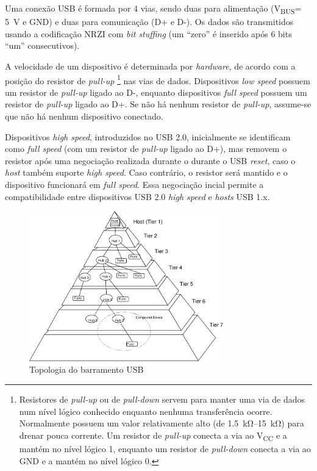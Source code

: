 \documentclass[brazil,pagestart=firstchapter]{abnt}
\newcommand{\VBUS}{V\textsubscript{BUS}\xspace}
\newcommand{\VCC}{V\textsubscript{CC}\xspace}
\newcommand{\GND}{GND\xspace}
\begin{document}
Uma conexão \ac{USB} é formada por 4 vias, sendo duas para alimentação
(\VBUS = \SI{+5}{\volt} e \GND) e duas para comunicação (D+ e D-). Os dados
são transmitidos usando a codificação \ac{NRZI} com \textit{bit stuffing}
(um ``zero'' é inserido após 6 bits ``um'' consecutivos).
\cite[p.~157]{usb20} \cite[cap.~2]{usbinanutshell}

A velocidade de um dispositivo é determinada por \textit{hardware}, de
acordo com a posição do resistor de \textit{pull-up}
	\footnote{Resistores de \textit{pull-up} ou de \textit{pull-down} servem
	para manter uma via de dados num nível lógico conhecido enquanto nenhuma
	transferência ocorre.  Normalmente possuem um valor relativamente alto
	(de \SIrange{1.5}{15}{\kilo\ohm}) para drenar pouca corrente. Um
	resistor de \textit{pull-up} conecta a via ao \VCC e a mantém no nível
	lógico 1, enquanto um resistor de \textit{pull-down} conecta a via ao
	\GND e a mantém no nível lógico 0.}
nas vias de dados. Dispositivos
\textit{low speed} possuem um resistor de \textit{pull-up} ligado ao D-,
enquanto dispositivos \textit{full speed} possuem  um resistor de
\textit{pull-up} ligado ao D+. Se não há nenhum resistor de
\textit{pull-up}, assume-se que não há nenhum dispositivo conectado.
\cite[p.~141]{usb20} \cite[cap.~2]{usbinanutshell}

Dispositivos \textit{high speed}, introduzidos no \ac{USB} 2.0, inicialmente
se identificam como \textit{full speed} (com um resistor de \textit{pull-up}
ligado ao D+), mas removem o resistor após uma negociação realizada durante
o durante o USB \textit{reset}, caso o \textit{host} também suporte
\textit{high speed}.  Caso contrário, o resistor será mantido e o
dispositivo funcionará em \textit{full speed}. Essa negociação incial
permite a compatibilidade entre dispositivos USB 2.0 \textit{high speed} e
\textit{hosts} USB 1.x. \cite[p.~142]{usb20} \cite[cap.~2]{usbinanutshell}

\begin{figure}[h]
\centering
\includegraphics[width=0.75\textwidth]{img/usb_bus_topology.pdf}
\caption{Topologia do barramento USB}
\label{fig:usb_topology}
\end{figure}
\end{document}
